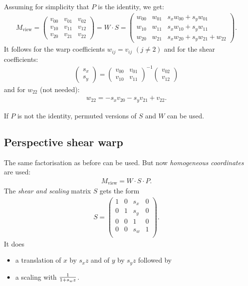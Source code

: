 Assuming for simplicity that $P$ is the identity, we get:
\begin{align*}
    M_\text{view} = \begin{pmatrix}
                         v_{00} & v_{01} & v_{02}\\
                         v_{10} & v_{11} & v_{12}\\
                         v_{20} & v_{21} & v_{22}
                    \end{pmatrix} = W\cdot S = 
            \begin{pmatrix}
                w_{00} & w_{01} & s_x w_{00} + s_y w_{01}\\
                w_{10} & w_{11} & s_x w_{10} + s_y w_{11}\\ 
                w_{20} & w_{21} & s_x w_{20} + s_y w_{21} + w_{22}
            \end{pmatrix}.
\end{align*}
It follows for the warp coefficients $w_{ij} = v_{ij}$ $(j\neq 2)$ and for the shear coefficients:
\begin{align*}
    \begin{pmatrix}
        s_x\\
        s_y 
    \end{pmatrix} =
    \begin{pmatrix}
        v_{00} & v_{01}\\
        v_{10} & v_{11} 
    \end{pmatrix}^{-1}
    \begin{pmatrix}
     v_{02}\\ v_{12}
    \end{pmatrix}
\end{align*}
and for $w_{22}$ (not needed):
\begin{align*}
    w_{22} = -s_x v_{20} -s_yv_{21} + v_{22}.
\end{align*}

If $P$ is not the identity, permuted versions of $S$ and $W$ can be used.

\subsection{Perspective shear warp}
The same factorisation as before can be used. But now \emph{homogeneous coordinates} are used:
\begin{align*}
    M_\text{view} = W\cdot S\cdot P.
\end{align*}
The \emph{shear and scaling} matrix $S$ gets the form
\begin{align*}
  S = 
    \begin{pmatrix}
     1&0&s_x&0\\
     0&1&s_y&0\\
     0&0&1&0\\
     0&0&s_w&1\\
    \end{pmatrix}.
\end{align*}
It does
\begin{itemize}
\item a translation of $x$ by $s_x z$ and of $y$ by $s_y z$ followed by
\item a scaling with ${1\over 1+s_w z}$.
\end{itemize}

